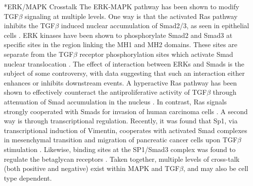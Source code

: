 \documentclass[12pt]{article}
\makeatletter
\renewcommand\subsubsection{\@startsection
	{subsubsection}{2}{0mm}
	{-0.05in}
	{-0.5\baselineskip}
	{\normalfont\normalsize\itshape}}
\makeatother
\begin{document}
\subsubsection*{ERK/MAPK Crosstalk}
The ERK-MAPK pathway has been shown to modify TGF$\beta$ signaling at multiple levels.
One way is that the activated Ras pathway inhibits the TGF$\beta$ induced nuclear accumulation of Smad2/3, as seen in epithelial cells \cite{Zhang2009a}.
ERK kinases have been shown to phosphorylate Smad2 and Smad3 at specific sites in the region linking the MH1 and MH2 domains.
These sites are separate from the TGF$\beta$ receptor phosphorylation sites which activate Smad nuclear translocation \cite{Massague2003}.
The effect of interaction between ERKs and Smads is the subject of some controversy, with data suggesting that such an interaction either enhances or inhibits downstream events.
A hyperactive Ras pathway has been shown to effectively counteract the antiproliferative activity of TGF$\beta$ through attenuation of Smad accumulation in the nucleus \cite{Kretzschmar:1999wb}.
In contrast, Ras signals strongly cooperated with Smads for invasion of human carcinoma cells \cite{Oft1996}.
A second way is through transcriptional regulation.
Recently, it was found that Sp1, via transcriptional induction of Vimentin, cooperates with activated Smad complexes in mesenchymal transition and migration of pancreatic cancer cells upon TGF$\beta$ stimulation \cite{Jungert:2007ri}.
Likewise, binding sites at the SP1/Smad3 complex was found to regulate the betaglycan receptors \cite{Lopez-Casillas2003}.
Taken together, multiple levels of cross-talk (both positive and negative) exist within MAPK and TGF$\beta$, and may also be cell type dependent.
\end{document}
